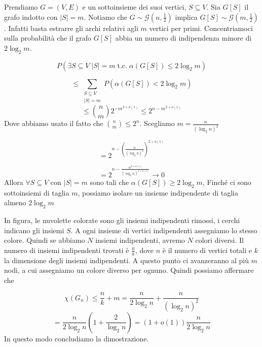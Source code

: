 \documentclass[12pt]{report}
\begin{document}
\begin{dimo}
    Prendiamo $G =(V,E)$ e un sottoinsieme dei suoi vertici, $S \subseteq V$. Sia $G[S]$ il grafo indotto con $|S| = m$. Notiamo che $G \sim \mathscr{G}(n,\frac{1}{2})$ implica $G[S] \sim \mathscr{G}(m,\frac{1}{2})$. Infatti basta estrarre gli archi relativi agli $m$ vertici per primi. Concentriamoci sulla probabilità che il grafo $G[S]$ abbia un numero di indipendenza minore di $2\log_2{m}$.

    $$P(\exists S \subseteq V \; |S| = m \; \text{t.c.} \; \alpha(G[S]) \leq 2\log_2{m})$$

    $$\leq \sum_{\substack{S \subseteq V \\ |S| = m}} P(\alpha(G[S]) < 2 \log_2{m})$$
    $$\leq \binom{n}{m} 2^{-m^{2 + o(1)}} \leq 2^{n-m^{2+o(1)}}$$
    Dove abbiamo usato il fatto che $\binom{n}{m} \leq 2^n$. Scegliamo $m = \frac{n}{(\log_2{n})^2}$

    $$= 2^{n - (\frac{n}{(\log_2{n})^2})^{2 + o(1)}}$$

    $$= 2^{n - \frac{n^{2 + o(1)}}{(\log_2{n})^{4 + o(1)}}} \rightarrow 0$$
    Allora $\forall S \subseteq V$ con $|S| = m$ sono tali che $\alpha(G[S]) \geq 2 \log_2{m}$, Finché ci sono sottoinsiemi di taglia $m$, possiamo isolare un insieme indipendente di taglia almeno $2\log_2{m}$


\noindent
In figura, le nuvolette colorate sono gli insiemi indipendenti rimossi, i cerchi indicano gli insiemi $S$.
A ogni insieme di vertici indipendenti assegniamo lo stesso colore. Quindi se abbiamo $N$ insiemi indipendenti, avremo $N$ colori diversi. Il numero di insiemi indipendenti trovati è $\frac{n}{k}$, dove $n$ è il numero di vertici totali e $k$ la dimensione degli insiemi indipendenti. A questo punto ci avanzeranno al più $m$ nodi, a cui assegniamo un colore diverso per ognuno. Quindi possiamo affermare che

$$\chi(G_n) \leq \frac{n}{k} + m = \frac{n}{2\log_2{n}} + \frac{n}{(\log_2{n})^2}$$
$$ = \frac{n}{2\log_2{n}} (1 + \frac{2}{\log_2{n}}) = (1 + o(1))\frac{n}{2\log_2{n}}$$
In questo modo concludiamo la dimostrazione.
\end{dimo}
\end{document}
